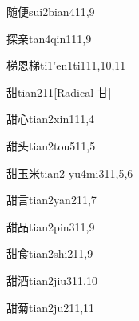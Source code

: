\begin{verbete}{随便}{sui2bian4}{11,9}
\end{verbete}

\begin{verbete}{探亲}{tan4qin1}{11,9}
\end{verbete}

\begin{verbete}{梯恩梯}{ti1'en1ti1}{11,10,11}
\end{verbete}

\begin{verbete}{甜}{tian2}{11}[Radical 甘]
\end{verbete}

\begin{verbete}{甜心}{tian2xin1}{11,4}
\end{verbete}

\begin{verbete}{甜头}{tian2tou5}{11,5}
\end{verbete}

\begin{verbete}{甜玉米}{tian2 yu4mi3}{11,5,6}
\end{verbete}

\begin{verbete}{甜言}{tian2yan2}{11,7}
\end{verbete}

\begin{verbete}{甜品}{tian2pin3}{11,9}
\end{verbete}

\begin{verbete}{甜食}{tian2shi2}{11,9}
\end{verbete}

\begin{verbete}{甜酒}{tian2jiu3}{11,10}
\end{verbete}

\begin{verbete}{甜菊}{tian2ju2}{11,11}
\end{verbete}

